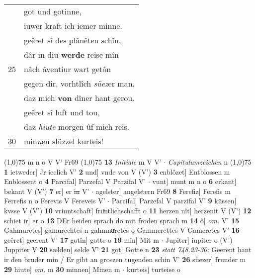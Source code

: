 \documentclass[8pt,a4paper,notitlepage]{article}
\begin{document}
\begin{table}[ht]
\begin{minipage}[t]{0.5\linewidth}
\begin{tabular}{rl}
 & got und gotinne,\\ 
 & iuwer kraft ich iemer minne.\\ 
 & geêret sî des plânêten schîn,\\ 
 & dâr in diu \textbf{werde} reise mîn\\ 
25 & nâch âventiur wart getân\\ 
 & gegen dir, vorhtlîch \textit{süez}er man,\\ 
 & daz mich \textbf{von} dîner hant gerou.\\ 
 & geêret sî luft und tou,\\ 
 & daz \textit{hiute} morgen ûf mich reis.\\ 
30 & min\textit{n}en slüzzel kurteis!\\ 
\end{tabular}
\scriptsize
\line(1,0){75} \newline
m n o V V' Fr69 \newline
\line(1,0){75} \newline
\textbf{13} \textit{Initiale} m V V'   $\cdot$ \textit{Capitulumzeichen} n  \newline
\line(1,0){75} \newline
\textbf{1} ietweder] Jr ieclich V' \textbf{2} und] vnde von V (V') \textbf{3} enblôzet] Entblossen m Enblossent o \textbf{4} Parcifal] Parzefal V Parzifal V'  $\cdot$ vunt] munt m n o \textbf{6} erkant] bekant V (V') \textbf{7} er] er \sout{in} V'  $\cdot$ agelster] angelstern Fr69 \textbf{8} Ferefiz] Ferefis m Ferrefis n o Ferevis V Fereveis V'  $\cdot$ Parcifal] Parzefal V parzifal V' \textbf{9} küssen] kvsse V (V') \textbf{10} vriuntschaft] fruͯntlichschafft o \textbf{11} herzen nît] herzenit V (V') \textbf{12} schiet ir] er o \textbf{13} DEr heiden sprach do mit froden sprach m \textbf{14} ô] \textit{om.} V' \textbf{15} Gahmuretes] gamurechtes n gahmnuͯretes o Gammerettes V Gameretes V' \textbf{16} geêret] geerent V' \textbf{17} gotîn] gotte o \textbf{19} mîn] Mit m  $\cdot$ Jupiter] iupiter o (V') Juppiter V \textbf{20} sælden] selde V' \textbf{21} got] Gotte n \textbf{23} \textit{statt 748.23-30:} Geerent hant ir den bruder min / Er gibt an groszen tugenden schin V'  \textbf{26} süezer] frunder m \textbf{29} hiute] \textit{om.} m \textbf{30} minnen] Minen m  $\cdot$ kurteis] turteise o \newline
\end{minipage}
\end{table}
\newpage
\end{document}

